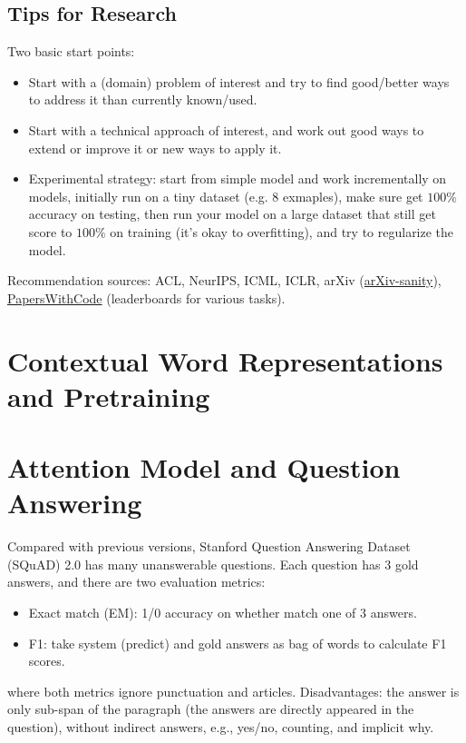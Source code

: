 \subsection{Tips for Research}
Two basic start points:
\begin{itemize}
	\item Start with a (domain) problem of interest and try to find good/better ways to address it than currently known/used.
	\item Start with a technical approach of interest, and work out good ways to extend or improve it or new ways to apply it.
	\item Experimental strategy: start from simple model and work incrementally on models, initially run on a tiny dataset (e.g. $8$ exmaples), make sure get $100\%$ accuracy on testing, then run your model on a large dataset that still get score to $100\%$ on training (it's okay to overfitting), and try to regularize the model.
\end{itemize}

Recommendation sources: ACL, NeurIPS, ICML, ICLR, arXiv (\href{http://www.arxiv-sanity.com/}{arXiv-sanity}), \href{https://paperswithcode.com/}{PapersWithCode} (leaderboards for various tasks).

\section{Contextual Word Representations and Pretraining} \label{contextual_word_rep}

\section{Attention Model and Question Answering}

Compared with previous versions, Stanford Question Answering Dataset (SQuAD) 2.0 has many unanswerable questions.
Each question has 3 gold answers, and there are two evaluation metrics:
\begin{itemize}
	\item Exact match (EM): 1/0 accuracy on whether match one of 3 answers.
	\item F1: take system (predict) and gold answers as bag of words to calculate F1 scores.
\end{itemize}
where both metrics ignore punctuation and articles.
Disadvantages:  the answer is only sub-span of the paragraph (the answers are directly appeared in the question), without indirect answers, e.g., yes/no, counting, and implicit why.

